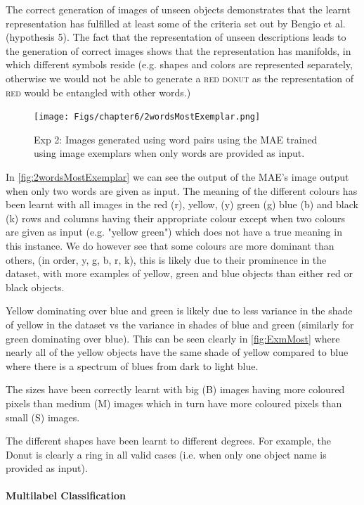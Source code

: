 The correct generation of images of unseen objects demonstrates that the learnt representation has fulfilled at least some of the criteria set out by Bengio et al. \cite{repRev} (hypothesis 5). The fact that the representation of unseen descriptions leads to the generation of correct images shows that the representation has manifolds, in which different symbols reside (e.g. shapes and colors are represented separately, otherwise we would not be able to generate a \textsc{red donut} as the representation of \textsc{red} would be entangled with other words.)

\begin{figure}[ht]
    \centering
    \texttt{[image: Figs/chapter6/2wordsMostExemplar.png]}
    \caption{Exp 2: Images generated using word pairs using the \ac{MAE} trained using image exemplars when only words are provided as input.}
    \label{fig:2wordsMostExemplar}
\end{figure}


In \autoref{fig:2wordsMostExemplar} we can see the output of the \ac{MAE}'s image output when only two words are given as input. The meaning of the different colours has been learnt with all images in the red (r), yellow, (y) green (g) blue (b) and black (k) rows and columns having their appropriate colour except when two colours are given as input (e.g. "yellow green") which does not have a true meaning in this instance. We do however see that some colours are more dominant than others, (in order, y, g, b, r, k), this is likely due to their prominence in the dataset, with more examples of yellow, green and blue objects than either red or black objects. 

Yellow dominating over blue and green is likely due to less variance in the shade of yellow in the dataset vs the variance in shades of blue and green (similarly for green dominating over blue). This can be seen clearly in \autoref{fig:ExmMost} where nearly all of the yellow objects have the same shade of yellow compared to blue where there is a spectrum of blues from dark to light blue.

The sizes have been correctly learnt with big (B) images having more coloured pixels than medium (M) images which in turn have more coloured pixels than small (S) images.

The different shapes have been learnt to different degrees. For example, the Donut is clearly a ring in all valid cases (i.e. when only one object name is provided as input).

\paragraph{Multilabel Classification}


